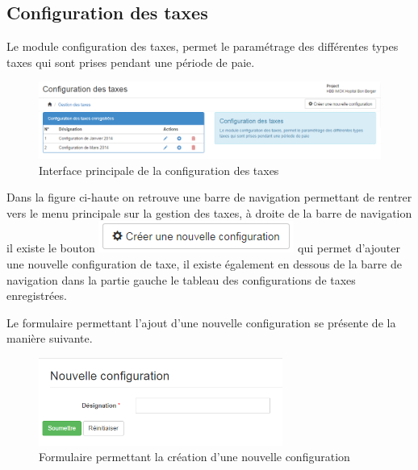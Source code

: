 \documentclass[12pt,a4paper]{report}
\begin{document}
\subsection{Configuration des taxes}
Le module configuration des taxes, permet le paramétrage des différentes types taxes qui sont prises pendant une période de paie.

\begin{figure}[h]
\begin{center}
\includegraphics[width=14cm]{pic/ConfTaxePeriod.png}
\end{center}
\caption{Interface principale de la configuration des taxes}
\label{Interface principale de la configuration des taxes}
\end{figure}

Dans la figure ci-haute on retrouve une barre de navigation permettant de rentrer vers le menu principale sur la gestion des taxes, à droite de la barre de navigation il existe le bouton \includegraphics[scale=1]{pic/CreateNewConfig.png} qui permet d'ajouter une nouvelle configuration de taxe, il existe également en dessous de la barre de navigation dans la partie gauche le tableau des configurations de taxes enregistrées.

Le formulaire permettant l'ajout d'une nouvelle configuration se présente de la manière suivante. 

\begin{figure}[h]
\begin{center}
\includegraphics[width=8cm]{pic/NouvConfigT.png}
\end{center}
\caption{Formulaire permettant la création d'une nouvelle configuration}
\label{Formulaire permettant la création d'une nouvelle configuration}
\end{figure} 
\end{document}
